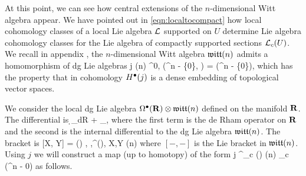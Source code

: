 \documentclass[11pt]{amsart}
\begin{document}
At this point, we can see how central extensions of the $n$-dimensional Witt algebra appear.
We have pointed out in \eqref{eqn:localtocompact} how local cohomology classes of a local Lie algebra $\mathcal L$ supported on $U$ determine Lie algebra cohomology classes for the Lie algebra of compactly supported sections $\mathcal L_c(U)$.
We recall in appendix \cite{appx:model}, the $n$-dimensional Witt algebra $\mathfrak{witt}(n)$ admits a homomorphism of dg Lie algebras
\beqn
j \colon {}(n) \hookrightarrow \Omega^{0,\bu} (\C^n - \{0\}, \T) = \cT(\C^n - \{0\}),
\eeqn
which has the property that in cohomology $H^\bullet(j)$ is a dense embedding of topological vector spaces.

We consider the local dg Lie algebra $\Omega^\bullet(\mathbf{R}) \otimes \mathfrak{witt}(n)$ defined on the manifold $\mathbf{R}$.
The differential is 
\beqn
\d_{dR} \otimes \id + \id \otimes \dbar_{},
\eeqn
where the first term is the de Rham operator on $\mathbf{R}$ and the second is the internal differential to the dg Lie algebra $\mathfrak{witt}(n)$.
The bracket is
\beqn\label{eqn:tensorbracket}
[\eta \otimes X, \theta \otimes Y] = (\eta \theta) \otimes [X,Y] , \quad \eta,\theta \in \Omega^\bu(\R), \;\; X,Y \in {}(n)
\eeqn
where $[-,-]$ is the Lie bracket in $\mathfrak{witt}(n)$.
Using $j$ we will construct a map (up to homotopy) of the form
\beqn
\til j \colon \Omega^\bu_c (\R) \otimes {}(n) \to \cT_c (\C^n - 0)
\eeqn
as follows.
\end{document}
